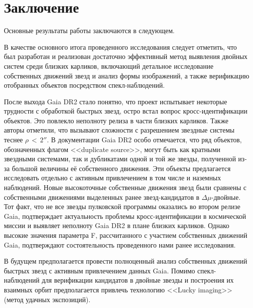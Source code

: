 \chapter*{Заключение}                       %


Основные результаты работы заключаются в следующем.

В качестве основного итога проведенного исследования следует отметить, что был разработан и реализован достаточно эффективный метод выявления двойных систем среди близких карликов, включающий детальное исследование собственных движений звезд и анализ формы изображений, а также верификацию отобранных объектов посредством спекл-наблюдений.

После выхода Gaia DR2 стало понятно, что проект испытывает некоторые трудности с обработкой быстрых звезд, остро встал вопрос кросс-идентификации объектов. Это повлекло неполноту релиза в части близких карликов. Также авторы отметили, что вызывают сложности с разрешением звездные системы теснее $\rho\,<\,2''$. В документации Gaia DR2 особо отмечается, что ряд объектов, обозначенных флагом <<duplicate source>>, могут быть как кратными звездными системами, так и дубликатами одной и той же звезды, полученной из-за большой величины её собственного движения. Эти объекты предлагается исследовать отдельно с активным привлечением в том числе и наземных наблюдений. Новые высокоточные собственные движения звезд были сравнены с собственными движениями выделенных ранее звезд-кандидатов в $\Delta\mu$-двойные. Тот факт, что не все звезды пулковской программы оказались во втором релизе Gaia, подтверждает актуальность проблемы кросс-идентификации в космической миссии и выявляет неполноту Gaia DR2 в плане близких карликов. Однако высокие значения параметра F, рассчитанного с участием собственных движений Gaia, подтверждают состоятельность проведенного нами ранее исследования.

В будущем предполагается провести полноценный анализ собственных движений быстрых звезд с активным привлечением данных Gaia. Помимо спекл-наблюдений для верификации кандидатов в двойные звезды и построения их взаимных орбит предполагается привлечь технологию <<Lucky imaging>>(метод удачных экспозиций).

